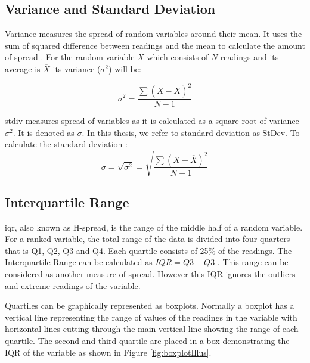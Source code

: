 \subsection{Variance and Standard Deviation}

Variance measures the spread of random variables around their mean. It uses the sum of squared difference between readings and the mean to calculate the amount of spread \cite{Kenney1947}. For the random variable $X$ which consists of $N$ readings and its average is $\overline{X}$ its variance ($\sigma^{2}$) will be:

\begin{equation*}
	\sigma^{2} = \frac{\sum (X - \overline{X})^{2}}{N -1}
\end{equation*}

\acrfull{stdiv} measures spread of variables as it is calculated as a square root of variance $\sigma^{2}$. It is denoted as $\sigma$. In this thesis, we refer to standard deviation as StDev. To calculate the standard deviation \cite{Kenney1947}:
\begin{equation*}
	\sigma = \sqrt{\sigma^{2}} = \sqrt{\frac{\sum (X - \overline{X})^{2}}{N -1}}
\end{equation*}


\subsection{Interquartile Range}

\acrfull{iqr}, also known as H-spread, is the range of the middle half of a random variable. For a ranked variable, the total range of the data is divided into four quarters that is Q1, Q2, Q3 and Q4. Each quartile consists of 25\% of the readings. The Interquartile Range can be calculated as $IQR = Q3 - Q3$ \cite{Ross2010}. This range can be considered as another measure of spread. However this IQR ignores the outliers and extreme readings of the variable.

Quartiles can be graphically represented as boxplots. Normally a boxplot has a vertical line representing the range of values of the readings in the variable with horizontal lines cutting through the main vertical line showing the range of each quartile. The second and third quartile are placed in a box demonstrating the IQR of the variable as shown in Figure \ref{fig:boxplotIllus}.


